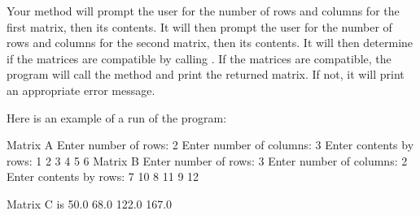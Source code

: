 \begin{exercise}
Your  method will prompt the user for the number of rows and columns for the first matrix, then its contents. It will then prompt the user for the number of rows and columns for the second matrix, then its contents. It will then determine if the matrices are compatible by calling . If the matrices are compatible, the program will call the  method and print the returned matrix. If not, it will print an appropriate error message.

Here is an example of a run of the program:

\begin{stdout}
Matrix A
Enter number of rows: 2
Enter number of columns: 3
Enter contents by rows: 1 2 3 4 5 6
Matrix B
Enter number of rows: 3
Enter number of columns: 2
Enter contents by rows: 7 10 8 11 9 12

Matrix C is
50.0 68.0 
122.0 167.0
\end{stdout}

\end{exercise}
